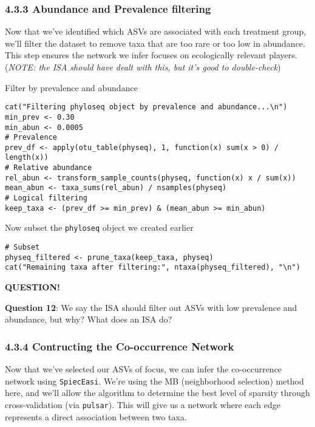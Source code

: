 \documentclass[
]{book}
\newenvironment{bluebox}{
  \definecolor{shadecolor}{RGB}{172, 210, 237}
  \color{white}
  \begin{shaded}}
 {\end{shaded}}
\begin{document}
\subsubsection{4.3.3 Abundance and Prevalence filtering}\label{abundance-and-prevalence-filtering}

Now that we've identified which ASVs are associated with each treatment group, we'll filter the dataset to remove taxa that are too rare or too low in abundance. This step ensures the network we infer focuses on ecologically relevant players. (\emph{NOTE: the ISA should have dealt with this, but it's good to double-check})

Filter by prevalence and abundance

\begin{verbatim}
cat("Filtering phyloseq object by prevalence and abundance...\n")
min_prev <- 0.30
min_abun <- 0.0005
# Prevalence
prev_df <- apply(otu_table(physeq), 1, function(x) sum(x > 0) / length(x))
# Relative abundance
rel_abun <- transform_sample_counts(physeq, function(x) x / sum(x))
mean_abun <- taxa_sums(rel_abun) / nsamples(physeq)
# Logical filtering
keep_taxa <- (prev_df >= min_prev) & (mean_abun >= min_abun)
\end{verbatim}

Now subset the \texttt{phyloseq} object we created earlier

\begin{verbatim}
# Subset
physeq_filtered <- prune_taxa(keep_taxa, physeq)
cat("Remaining taxa after filtering:", ntaxa(physeq_filtered), "\n")
\end{verbatim}

\begin{bluebox}

\begin{center}
\textbf{QUESTION!}

\end{center}

\textbf{Question 12}: We say the ISA should filter out ASVs with low prevalence and abundance, but why? What does an ISA do?

\end{bluebox}

\subsubsection{4.3.4 Contructing the Co-occurrence Network}\label{contructing-the-co-occurrence-network}

Now that we've selected our ASVs of focus, we can infer the co-occurrence network using \texttt{SpiecEasi}. We're using the MB (neighborhood selection) method here, and we'll allow the algorithm to determine the best level of sparsity through cross-validation (via \texttt{pulsar}). This will give us a network where each edge represents a direct association between two taxa.
\end{document}

